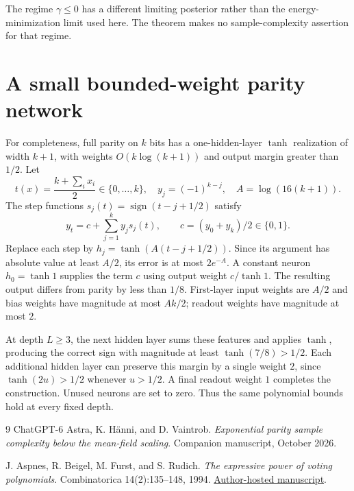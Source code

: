 \documentclass[11pt]{article}
\theoremstyle{remark}\newtheorem{remark}[theorem]{Remark}
\DeclareMathOperator{\sign}{sign}\DeclareMathOperator{\Var}{Var}
\begin{document}
The regime $\gamma\le0$ has a different limiting posterior rather
than the energy-minimization limit used here. The theorem makes no
sample-complexity assertion for that regime.

\appendix
\section{A small bounded-weight parity network}\label{sec:paritycircuit}
For completeness, full parity on $k$ bits has a one-hidden-layer
$\tanh$ realization of width $k+1$, with weights $O(k\log(k+1))$
and output margin greater than $1/2$. Let
\[
 t(x)=\frac{k+\sum_i x_i}{2}\in\{0,\ldots,k\},\quad
 y_j=(-1)^{k-j},\quad A=\log(16(k+1)).
\]
The step functions $s_j(t)=\sign(t-j+1/2)$ satisfy
\[
 y_t=c+\sum_{j=1}^k y_js_j(t),\qquad c=(y_0+y_k)/2\in\{0,1\}.
\]
Replace each step by $h_j=\tanh(A(t-j+1/2))$. Since its argument
has absolute value at least $A/2$, its error is at most $2e^{-A}$.
A constant neuron $h_0=\tanh1$ supplies the term $c$ using output
weight $c/\tanh1$. The resulting output differs from parity by
less than $1/8$. First-layer input weights are $A/2$ and bias
weights have magnitude at most $Ak/2$; readout weights have
magnitude at most $2$.

At depth $L\ge3$, the next hidden layer sums these features and
applies $\tanh$, producing the correct sign with magnitude at least
$\tanh(7/8)>1/2$. Each additional hidden layer can preserve this
margin by a single weight $2$, since $\tanh(2u)>1/2$ whenever
$u>1/2$. A final readout weight $1$ completes the construction.
Unused neurons are set to zero. Thus the same polynomial bounds
hold at every fixed depth.

\begin{thebibliography}{9}
ChatGPT-6 Astra, K. H\"anni, and D. Vaintrob.
\emph{Exponential parity sample complexity below the mean-field scaling}.
Companion manuscript, October 2026.

 J. Aspnes, R. Beigel, M. Furst, and S. Rudich.
\emph{The expressive power of voting polynomials}.
Combinatorica 14(2):135--148, 1994.
\href{https://www.cs.yale.edu/homes/aspnes/papers/stoc91voting.pdf}{Author-hosted manuscript}.
\end{thebibliography}
\end{document}
